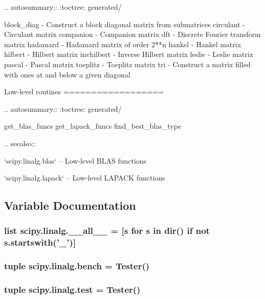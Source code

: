 \begin{DoxyVerb}
.. autosummary::
   :toctree: generated/

   block_diag - Construct a block diagonal matrix from submatrices
   circulant - Circulant matrix
   companion - Companion matrix
   dft - Discrete Fourier transform matrix
   hadamard - Hadamard matrix of order 2**n
   hankel - Hankel matrix
   hilbert - Hilbert matrix
   invhilbert - Inverse Hilbert matrix
   leslie - Leslie matrix
   pascal - Pascal matrix
   toeplitz - Toeplitz matrix
   tri - Construct a matrix filled with ones at and below a given diagonal

Low-level routines
==================

.. autosummary::
   :toctree: generated/

   get_blas_funcs
   get_lapack_funcs
   find_best_blas_type

.. seealso::

   `scipy.linalg.blas` -- Low-level BLAS functions

   `scipy.linalg.lapack` -- Low-level LAPACK functions\end{DoxyVerb}
 

\subsection{Variable Documentation}
\hypertarget{namespacescipy_1_1linalg_a63158add5d39fe2377cbc06247a194b7}{}
\subsubsection[{\+\_\+\+\_\+all\+\_\+\+\_\+}]{\setlength{\rightskip}{0pt plus 5cm}list scipy.\+linalg.\+\_\+\+\_\+all\+\_\+\+\_\+ = \mbox{[}{\bf s} for {\bf s} in dir() {\bf if} not s.\+startswith('\+\_\+')\mbox{]}}\label{namespacescipy_1_1linalg_a63158add5d39fe2377cbc06247a194b7}
\hypertarget{namespacescipy_1_1linalg_a092ee30669cf7e85b1818062aac0a437}{}
\subsubsection[{bench}]{\setlength{\rightskip}{0pt plus 5cm}tuple scipy.\+linalg.\+bench = Tester()}\label{namespacescipy_1_1linalg_a092ee30669cf7e85b1818062aac0a437}
\hypertarget{namespacescipy_1_1linalg_a2ae3d22ab02369253ff16df0bf6d00e2}{}
\subsubsection[{test}]{\setlength{\rightskip}{0pt plus 5cm}tuple scipy.\+linalg.\+test = Tester()}\label{namespacescipy_1_1linalg_a2ae3d22ab02369253ff16df0bf6d00e2}
